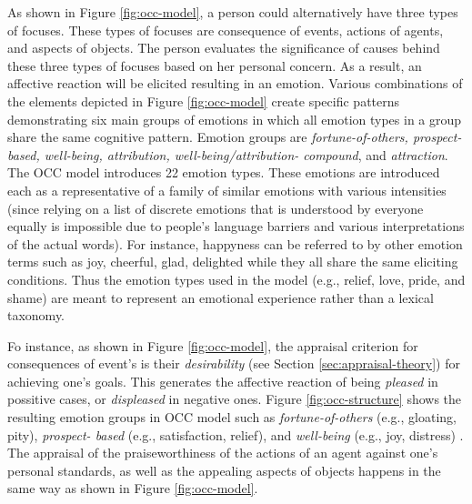 \documentclass[11pt]{article}
\begin{document}
As shown in Figure \ref{fig:occ-model}, a person could alternatively have three
types of focuses. These types of focuses are consequence of events, actions of
agents, and aspects of objects. The person evaluates the significance of causes
behind these three types of focuses based on her personal concern. As a
result, an affective reaction will be elicited resulting in an emotion. Various
combinations of the elements depicted in Figure \ref{fig:occ-model} create
specific patterns demonstrating six main groups of emotions in which all emotion
types in a group share the same cognitive pattern. Emotion groups are
\textit{fortune-of-others, prospect-based, well-being, attribution,
well-being/attribution- compound}, and \textit{attraction}. The OCC model
introduces 22 emotion types. These emotions are introduced each as a
representative of a family of similar emotions with various intensities
(since relying on a list of discrete emotions that is understood by everyone
equally is impossible due to people's language barriers and various
interpretations of the actual words). For instance, happyness can be referred to
by other emotion terms such as joy, cheerful, glad, delighted while they all
share the same eliciting conditions. Thus the emotion types used in the model
(e.g., relief, love, pride, and shame) are meant to represent an emotional
experience rather than a lexical taxonomy.

Fo instance, as shown in Figure \ref{fig:occ-model}, the appraisal criterion for
consequences of event’s is their \textit{desirability} (see Section
\ref{sec:appraisal-theory}) for achieving one’s goals. This generates the
affective reaction of being \textit{pleased} in possitive cases, or
\textit{displeased} in negative ones. Figure \ref{fig:occ-structure} shows the
resulting emotion groups in OCC model such as \textit{fortune-of-others} (e.g.,
gloating, pity), \textit{prospect- based} (e.g., satisfaction, relief), and
\textit{well-being} (e.g., joy, distress) \cite{occ:structure}. The appraisal of
the praiseworthiness of the actions of an agent against one's personal
standards, as well as the appealing aspects of objects happens in the same way
as shown in Figure \ref{fig:occ-model}.
\end{document}
